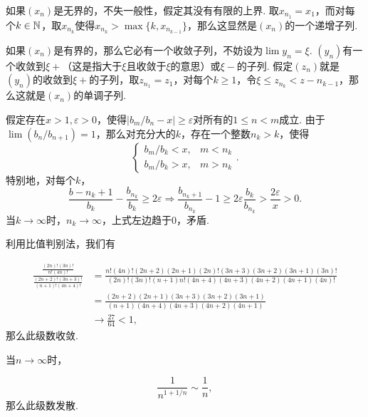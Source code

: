 \begin{ans}
  如果$(x_n)$是无界的，不失一般性，假定其没有有限的上界. 取$x_{n_1}=x_1$，而对每个$k\in\mathbb N$，取$x_{n_k}$使得$x_{n_k}>\max\{k,x_{n_{k-1}}\}$，那么这显然是$(x_n)$的一个递增子列.

  如果$(x_n)$是有界的，那么它必有一个收敛子列，不妨设为$\lim y_n=\xi$. $(y_n)$有一个收敛到$\xi+$（这是指大于$\xi$且收敛于$\xi$的意思）或$\xi-$的子列. 假定$(z_n)$就是$(y_n)$的收敛到$\xi+$的子列，取$z_{n_1}=z_1$，对每个$k\ge1$，令$\xi\le z_{n_k}<z-{n_{k-1}}$，那么这就是$(x_n)$的单调子列.
\end{ans}

\begin{ans}
  假定存在$x>1,\varepsilon>0$，使得$|b_m/b_n-x|\ge\varepsilon$对所有的$1\le n<m$成立. 由于$\lim(b_n/b_{n+1})=1$，那么对充分大的$k$，存在一个整数$n_k>k$，使得
  \[
    \begin{cases}
      b_m/b_k < x, & m<n_k\\
      b_m/b_k > x, & m>n_k
    \end{cases}.
  \]
  特别地，对每个$k$，
  \[ \frac{b-{n_k+1}}{b_k} - \frac{b_{n_k}}{b_k} \ge2
  \varepsilon
  \Rightarrow \frac{b_{n_k+1}}{b_{n_k}} -1
  \ge 2\varepsilon\frac{b_k}{b_{n_k}} >\frac{2\varepsilon}x>0. \]
  当$k\to\infty$时，$n_k\to\infty$，上式左边趋于0，矛盾.
\end{ans}

\begin{ans}
  \begin{enumb}
  \item 利用比值判别法，我们有
  \end{enumb}
  \begin{align*}
    \frac{\frac{(2n)!(3n)!}{n!(4n)!}}
    {\frac{(2n+2)!(3n+3)!}{(n+1)!(4n+4)!}}
    & = \frac{n!(4n)!(2n+2)(2n+1)(2n)!(3n+3)(3n+2)(3n+1)(3n)!}
    {(2n)!(3n)!(n+1)n!(4n+4)(4n+3)(4n+2)(4n+1)(4n)!}\\
    & = \frac{(2n+2)(2n+1)(3n+3)(3n+2)(3n+1)}
    {(n+1)(4n+4)(4n+3)(4n+2)(4n+1)}\\
    & \rightarrow \frac{27}{64}<1,
  \end{align*}
  那么此级数收敛.\\
  \begin{enumb}\setcounter{enumi}{1}
    \item 当$n\to\infty$时，
  \end{enumb}
    \[\frac1{n^{1+1/n}} \sim \frac1n,\]
  那么此级数发散.
\end{ans}

